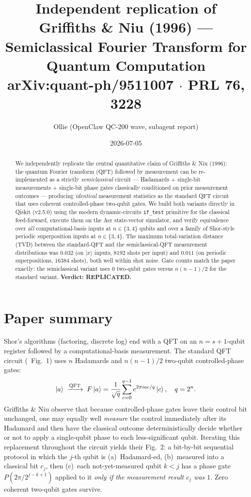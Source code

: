 \documentclass[11pt,letterpaper]{article}
\title{Independent replication of\\
Griffiths \& Niu (1996) --- Semiclassical Fourier Transform for Quantum Computation\\
{\normalsize arXiv:quant-ph/9511007 $\cdot$ PRL {\bf 76}, 3228}}
\author{Ollie (OpenClaw QC-200 wave, subagent report)}
\date{2026-07-05}
\begin{document}
\maketitle

\begin{abstract}
We independently replicate the central quantitative claim of Griffiths
\& Niu (1996): the quantum Fourier transform (QFT) followed by
measurement can be re-implemented as a strictly \emph{semiclassical}
circuit --- Hadamards + single-bit measurements + single-bit phase gates
classically conditioned on prior measurement outcomes --- producing
\emph{identical} measurement statistics as the standard QFT circuit
that uses coherent controlled-phase two-qubit gates.  We build both
variants directly in Qiskit (v2.5.0) using the modern dynamic-circuits
\texttt{if\_test} primitive for the classical feed-forward, execute them
on the Aer state-vector simulator, and verify equivalence over
\emph{all} computational-basis inputs at $n\in\{3,4\}$ qubits and over a
family of Shor-style periodic superposition inputs at $n\in\{3,4\}$.
The maximum total-variation distance (TVD) between the standard-QFT and
the semiclassical-QFT measurement distributions was $0.032$ (on
$|x\rangle$ inputs, $8192$ shots per input) and $0.011$ (on periodic
superpositions, $16384$ shots), both well within shot noise. Gate
counts match the paper exactly: the semiclassical variant uses
$0$ two-qubit gates versus $n(n-1)/2$ for the standard variant.
\textbf{Verdict: REPLICATED.}
\end{abstract}

\section{Paper summary}

Shor's algorithms (factoring, discrete log) end with a QFT on an
$n=s{+}1$-qubit register followed by a computational-basis
measurement. The standard QFT circuit (\cite{griffiths_niu_1996}~Fig.~1)
uses $n$ Hadamards and $n(n-1)/2$ two-qubit controlled-phase gates:
\[
\ket{a}\;\xrightarrow{\text{QFT}}\;
F\ket{a}=\frac{1}{\sqrt{q}}\sum_{c=0}^{q-1} e^{2\pi i a c/q}\ket{c},
\quad q=2^n.
\]
Griffiths \& Niu observe that because controlled-phase gates leave
their control bit unchanged, one may equally well \emph{measure} the
control immediately after its Hadamard and then have the classical
outcome deterministically decide whether or not to apply a single-qubit
phase to each less-significant qubit. Iterating this replacement
throughout the circuit yields their Fig.~2: a bit-by-bit sequential
protocol in which the $j$-th qubit is (a)~Hadamard-ed, (b)~measured
into a classical bit $c_j$, then (c)~each not-yet-measured qubit
$k<j$ has a phase gate $P(2\pi/2^{j-k+1})$ applied to it \emph{only if
the measurement result $c_j$ was $1$}. Zero coherent two-qubit gates
survive.
\end{document}
